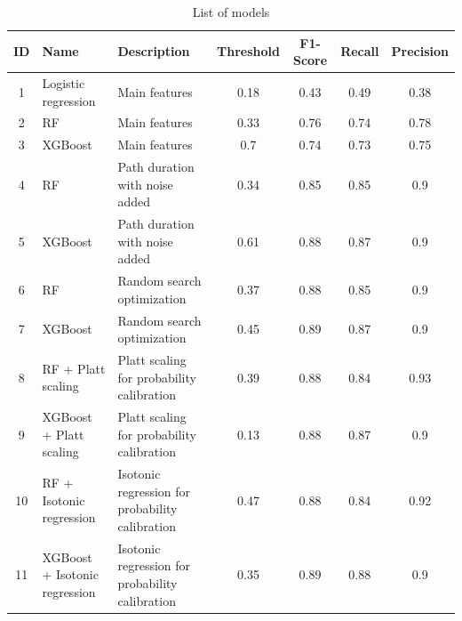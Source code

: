 \documentclass[12pt]{article}
\begin{document}
\FloatBarrier
\begin{table}[ht]
\centering
\caption{List of models}
\label{tab:List of models}
\renewcommand{\arraystretch}{3}
\begin{small}
\begin{tabularx}{\textwidth}{|c|X|X|c|c|c|c|}
\hline
\textbf{ID} & \textbf{Name} & \textbf{Description} & \textbf{Threshold} & \textbf{F1-Score} & \textbf{Recall} & \textbf{Precision} \\ \hline
1 & Logistic regression & Main features & 0.18 & 0.43 & 0.49 & 0.38  \\ \hline
2 & RF & Main features & 0.33 & 0.76 & 0.74 & 0.78  \\ \hline
3 & XGBoost & Main features & 0.7 & 0.74 & 0.73 & 0.75 \\ \hline
4 & RF & Path duration with noise added & 0.34 & 0.85 & 0.85 & 0.9  \\ \hline
5 & XGBoost & Path duration with noise added & 0.61 & 0.88 & 0.87 & 0.9  \\ \hline
6 & RF & Random search optimization & 0.37 & 0.88 & 0.85 & 0.9  \\ \hline
7 & XGBoost & Random search optimization & 0.45 & 0.89 & 0.87 & 0.9  \\ \hline
8 & RF + Platt scaling & Platt scaling for probability calibration & 0.39 & 0.88 & 0.84 & 0.93 \\ \hline
9 & XGBoost + Platt scaling & Platt scaling for probability calibration & 0.13 & 0.88 & 0.87 & 0.9  \\ \hline
10 & RF + Isotonic regression & Isotonic regression for probability calibration & 0.47 & 0.88 & 0.84 & 0.92  \\ \hline
11 & XGBoost + Isotonic regression & Isotonic regression for probability calibration & 0.35 & 0.89 & 0.88 & 0.9 \\ \hline
\end{tabularx}
\end{small}
\end{table}
\FloatBarrier
\end{document}
